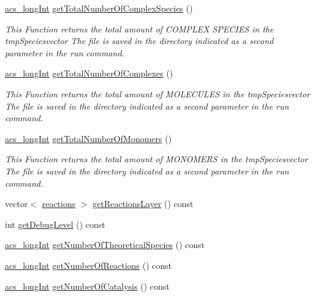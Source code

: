 \begin{DoxyCompactItemize}
\hyperlink{a00016_a19319d75f02db4308bc5c0026d98cd85}{acs\-\_\-long\-Int} \hyperlink{a00003_a453d88017912e8b5973310ea2b044266}{get\-Total\-Number\-Of\-Complex\-Species} ()
\begin{DoxyCompactList}\small\item\em This Function returns the total amount of C\-O\-M\-P\-L\-E\-X S\-P\-E\-C\-I\-E\-S in the tmp\-Speciesvector The file is saved in the directory indicated as a second parameter in the run command. \end{DoxyCompactList}\item 
\hyperlink{a00016_a19319d75f02db4308bc5c0026d98cd85}{acs\-\_\-long\-Int} \hyperlink{a00003_ab564c7ddffd3dba896d5b049e1257793}{get\-Total\-Number\-Of\-Complexes} ()
\begin{DoxyCompactList}\small\item\em This Function returns the total amount of M\-O\-L\-E\-C\-U\-L\-E\-S in the tmp\-Speciesvector The file is saved in the directory indicated as a second parameter in the run command. \end{DoxyCompactList}\item 
\hyperlink{a00016_a19319d75f02db4308bc5c0026d98cd85}{acs\-\_\-long\-Int} \hyperlink{a00003_aa8c94019533639038f99587fc2b029dc}{get\-Total\-Number\-Of\-Monomers} ()
\begin{DoxyCompactList}\small\item\em This Function returns the total amount of M\-O\-N\-O\-M\-E\-R\-S in the tmp\-Speciesvector The file is saved in the directory indicated as a second parameter in the run command. \end{DoxyCompactList}\item 
vector$<$ \hyperlink{a00013}{reactions} $>$ \hyperlink{a00003_a3d44f3f4a8f9010fa99c49f5cc961416}{get\-Reactions\-Layer} () const 
\item 
int \hyperlink{a00003_a2de42381b0b9cba889bbb95c1456cfe5}{get\-Debug\-Level} () const 
\item 
\hyperlink{a00016_a19319d75f02db4308bc5c0026d98cd85}{acs\-\_\-long\-Int} \hyperlink{a00003_ab98d4ad28b101f08279aa3458d5dfda3}{get\-Number\-Of\-Theoretical\-Species} () const 
\item 
\hyperlink{a00016_a19319d75f02db4308bc5c0026d98cd85}{acs\-\_\-long\-Int} \hyperlink{a00003_abf45b6406f8c0e95c4c5edf6b374e112}{get\-Number\-Of\-Reactions} () const 
\item 
\hyperlink{a00016_a19319d75f02db4308bc5c0026d98cd85}{acs\-\_\-long\-Int} \hyperlink{a00003_a21609adb1a83a4cb7eaec78a90acd624}{get\-Number\-Of\-Catalysis} () const 

\end{DoxyCompactItemize}
